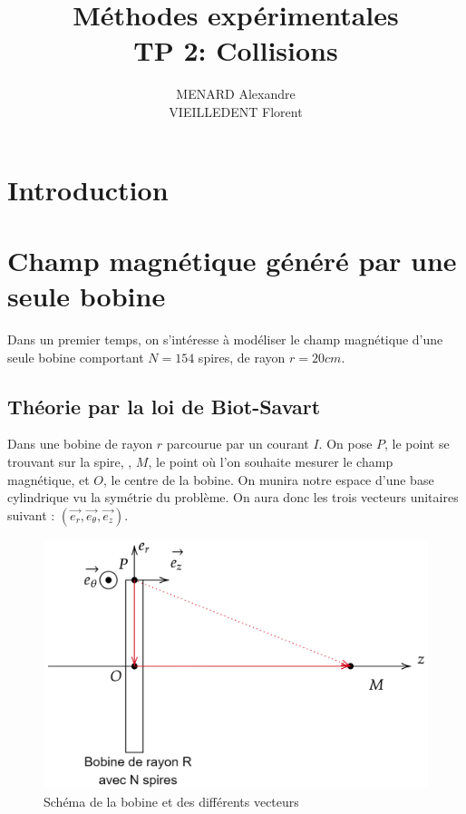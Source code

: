 \documentclass[12pt]{article}
\title{\textbf{Méthodes expérimentales} \\ TP 2: Collisions}
\author{MENARD Alexandre \\ VIEILLEDENT Florent}
\begin{document}
\maketitle

\section*{Introduction}

\newpage
\section{Champ magnétique généré par une seule bobine}
Dans un premier temps, on s'intéresse à modéliser le champ magnétique d'une seule bobine comportant 
$N = 154$ spires, de rayon $r = 20cm$.

\subsection{Théorie par la loi de Biot-Savart}
Dans une bobine de rayon $r$ parcourue par un courant $I$. On pose $P$, le point se trouvant sur la spire,
, $M$, le point où l'on souhaite mesurer le champ magnétique, et $O$, le centre de la bobine. On munira notre espace d'une base cylindrique vu
la symétrie du problème. On aura donc les trois vecteurs unitaires suivant : $(\vec{e_r}, \vec{e_\theta}, \vec{e_z})$.

\begin{figure}[h!]
    \begin{center}
        \includegraphics[scale=0.4]{img/theorie.png}
    \end{center}
    \caption{Schéma de la bobine et des différents vecteurs}
\end{figure}
\end{document}
